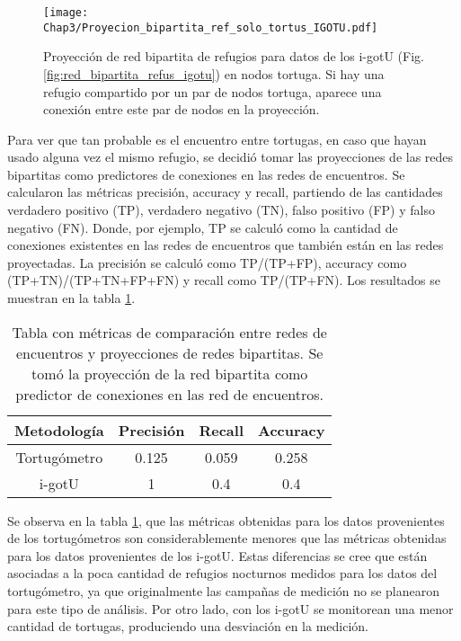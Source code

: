 \begin{figure}[ht]
    \begin{center}
        \texttt{[image: Chap3/Proyecion\_bipartita\_ref\_solo\_tortus\_IGOTU.pdf]}
        \caption[Proyección  de red bipartita de refugios para datos de los tortugómetros en nodos tortuga.]{Proyección  de red bipartita de refugios para datos de los i-gotU (Fig. \ref{fig:red_bipartita_refus_igotu}) en nodos tortuga. Si hay una refugio compartido por un par de nodos tortuga, aparece una conexión entre este par de nodos en la proyección. }
        \label{fig:proyeccion_red_igotu}
       
        \end{center}
\end{figure}
Para  ver que tan probable es el encuentro entre tortugas, en caso que hayan usado alguna vez el mismo refugio, se decidió tomar las proyecciones de las redes bipartitas como predictores de conexiones en las redes de encuentros. Se calcularon las métricas precisión, accuracy y recall, partiendo de las cantidades verdadero positivo (TP), verdadero negativo (TN), falso positivo (FP) y falso negativo (FN). Donde, por ejemplo, TP se calculó como la cantidad de conexiones existentes en las redes de encuentros que también están en las redes proyectadas. La precisión se calculó como TP/(TP+FP), accuracy como (TP+TN)/(TP+TN+FP+FN) y  recall como TP/(TP+FN). Los resultados se muestran en la tabla \ref{tab:metricas_comparacion_redes}.
 
\begin{table}[ht]
    \centering
    \begin{tabular}{|c|c|c|c|}
       
   \hline
    Metodología  & Precisión & Recall & Accuracy \\ \hline
    Tortugómetro & 0.125     & 0.059  & 0.258    \\ \hline
    i-gotU       & 1         & 0.4    & 0.4       \\ \hline
   
    \end{tabular}
    \caption[Tabla con métricas de comparación entre redes de encuentros y proyecciones de redes bipartitas.]{Tabla con métricas de comparación entre redes de encuentros y proyecciones de redes bipartitas. Se tomó la proyección de la red bipartita como predictor de conexiones en las red de encuentros.}
    \label{tab:metricas_comparacion_redes}
\end{table}
 
Se observa en la tabla \ref{tab:metricas_comparacion_redes}, que las métricas obtenidas para los datos provenientes de los tortugómetros son considerablemente menores que las métricas obtenidas para los datos provenientes de los i-gotU. Estas diferencias se cree que están asociadas a la poca cantidad de refugios nocturnos medidos para los datos del tortugómetro, ya que originalmente las campañas de medición no se planearon para este tipo de análisis. Por otro lado, con los i-gotU se monitorean una menor cantidad de tortugas, produciendo una desviación en la medición.
 
